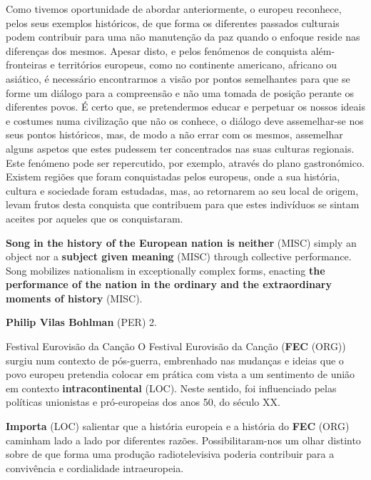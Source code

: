 \documentclass[12pt,a4paper]{article}
\begin{document}
Como  tivemos  oportunidade  de  abordar  anteriormente,  o  europeu  reconhece, pelos seus exemplos históricos, de que forma os diferentes passados culturais podem contribuir para uma não manutenção da paz quando o enfoque reside nas diferenças dos mesmos.  Apesar  disto,  e  pelos  fenómenos  de  conquista  além-fronteiras  e  territórios europeus,  como  no  continente  americano,  africano  ou  asiático,  é  necessário encontrarmos  a  visão  por  pontos  semelhantes  para  que  se  forme  um  diálogo  para  a compreensão e não uma tomada de posição perante os diferentes povos. É certo que, se pretendermos educar e perpetuar os nossos ideais e costumes numa civilização que não os conhece, o diálogo deve assemelhar-se nos seus pontos históricos, mas, de modo a não  errar  com  os  mesmos,  assemelhar  alguns  aspetos  que  estes  pudessem  ter concentrados  nas  suas  culturas  regionais.  Este  fenómeno  pode  ser  repercutido,  por exemplo, através do plano gastronómico. Existem regiões que foram conquistadas pelos europeus, onde a sua história, cultura e sociedade foram estudadas, mas, ao retornarem ao  seu  local  de  origem,  levam  frutos  desta  conquista  que  contribuem  para  que  estes indivíduos se sintam aceites por aqueles que os conquistaram.

\textbf{Song in the history of the European nation is neither} (MISC) simply an object nor a \textbf{subject given meaning} (MISC) through collective performance. Song mobilizes nationalism in exceptionally complex forms, enacting \textbf{the performance of the nation in the ordinary and the extraordinary moments of history} (MISC).

\textbf{Philip Vilas Bohlman} (PER) 2.

Festival Eurovisão da Canção O  Festival  Eurovisão  da  Canção  (\textbf{FEC} (ORG))  surgiu  num  contexto  de  pós-guerra, embrenhado nas mudanças e ideias que o povo europeu pretendia colocar em prática com vista  a  um  sentimento  de  união  em  contexto  \textbf{intracontinental} (LOC).  Neste  sentido,  foi influenciado  pelas  políticas  unionistas  e  pró-europeias  dos  anos  50,  do  século  XX.

\textbf{Importa} (LOC) salientar que a história europeia e a história do \textbf{FEC} (ORG) caminham lado a lado por diferentes razões. Possibilitaram-nos um olhar distinto sobre de que forma uma produção radiotelevisiva  poderia  contribuir  para  a  convivência  e  cordialidade  intraeuropeia.
\end{document}
